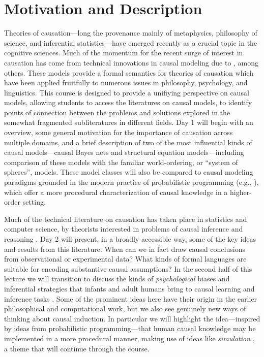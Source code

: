 \documentclass[english]{article}
\begin{document}
\section*{\large{Motivation and Description}}

Theories of causation---long the provenance mainly of metaphysics, philosophy of science, and inferential statistics---have emerged recently as a crucial topic in the cognitive sciences. Much of the momentum for the recent surge of interest in causation has come from technical innovations in causal modeling due to \citet{spirtes93,pearl00}, among others. These models provide a formal semantics for theories of causation which have been applied fruitfully to numerous issues in philosophy, psychology, and linguistics. This course is designed to provide a unifiying perspective on causal models, allowing students to access the literatures on causal models, to identify points of connection between the problems and solutions explored in the somewhat fragmented subliteratures in different fields. Day 1 will begin with an overview, some general motivation for the importance of causation across multiple domains, and a brief description of two of the most influential kinds of causal models---causal Bayes nets and structural equation models---including comparison of these models with the familiar world-ordering, or ``system of spheres'', models. These model classes will also be compared to causal modeling paradigms grounded in the modern practice of probabilistic programming (e.g., \citealt{goodmanetal15}), which offer a more procedural characterization of causal knowledge in a higher-order setting. 

Much of the technical literature on causation has taken place in statistics and computer science, by theorists interested in problems of causal inference and reasoning \citep{spirtes93,pearl00,Peters,BCII2020}. Day 2 will present, in a broadly accessible way, some of the key ideas and results from this literature. When can we in fact draw causal conclusions from observational or experimental data? What kinds of formal languages are suitable for encoding substantive causal assumptions? In the second half of this lecture we will transition to discuss the kinds of \emph{psychological} biases and inferential strategies that infants and adult humans bring to causal learning and inference tasks \citep{glymour01,gopnik04,gopnikschultz07}. Some of the prominent ideas here have their origin in the earlier philosophical and computational work, but we also see genuinely new ways of thinking about causal induction. In particular we will highlight the idea---inspired by ideas from probabilistic programming---that human causal knowledge may be implemented in a more procedural manner, making use of ideas like \emph{simulation} \citep{gerstenberg21}, a theme that will continue through the course.
\end{document}
